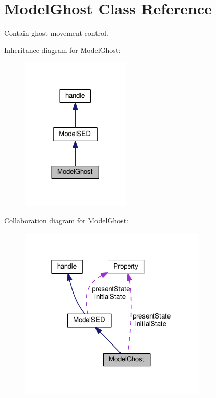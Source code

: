 \hypertarget{class_model_ghost}{}\section{Model\+Ghost Class Reference}
\label{class_model_ghost}


Contain ghost movement control.  




Inheritance diagram for Model\+Ghost\+:\nopagebreak
\begin{figure}[H]
\begin{center}
\leavevmode
\includegraphics[width=149pt]{class_model_ghost__inherit__graph}
\end{center}
\end{figure}


Collaboration diagram for Model\+Ghost\+:\nopagebreak
\begin{figure}[H]
\begin{center}
\leavevmode
\includegraphics[width=256pt]{class_model_ghost__coll__graph}
\end{center}
\end{figure}
